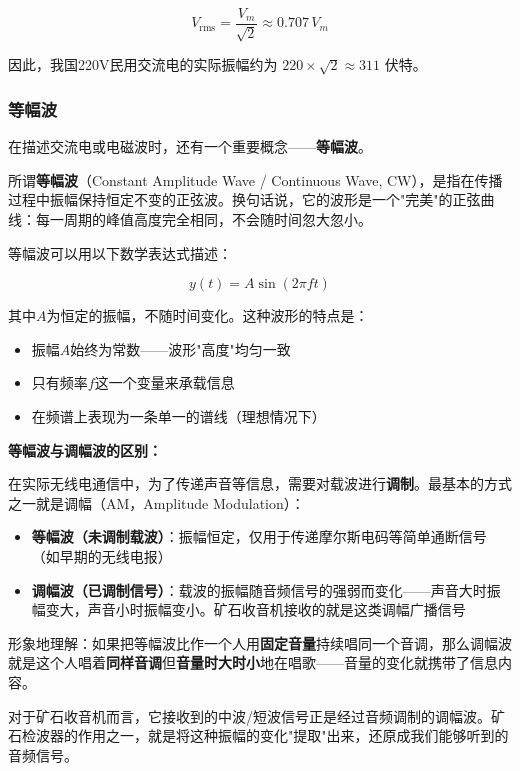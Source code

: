 \documentclass[12pt,UTF8]{ctexbook}
\begin{document}
\begin{equation}
	V_{\text{rms}} = \frac{V_{m}}{\sqrt{2}} \approx 0.707 \, V_{m}
\end{equation}

因此，我国220V民用交流电的实际振幅约为 $220 \times \sqrt{2} \approx 311$ 伏特。\subsubsection{等幅波}

在描述交流电或电磁波时，还有一个重要概念——\textbf{等幅波}。

所谓\textbf{等幅波}（Constant Amplitude Wave / Continuous Wave, CW），是指在传播过程中振幅保持恒定不变的正弦波。换句话说，它的波形是一个"完美"的正弦曲线：每一周期的峰值高度完全相同，不会随时间忽大忽小。

等幅波可以用以下数学表达式描述：

\begin{equation}
	y(t) = A \sin(2\pi f t)
\end{equation}

其中$A$为恒定的振幅，不随时间变化。这种波形的特点是：
\begin{itemize}
	\item 振幅$A$始终为常数——波形"高度"均匀一致
	\item 只有频率$f$这一个变量来承载信息
	\item 在频谱上表现为一条单一的谱线（理想情况下）
\end{itemize}

\textbf{等幅波与调幅波的区别：}

在实际无线电通信中，为了传递声音等信息，需要对载波进行\textbf{调制}。最基本的方式之一就是调幅（AM，Amplitude Modulation）：

\begin{itemize}
	\item \textbf{等幅波（未调制载波）}：振幅恒定，仅用于传递摩尔斯电码等简单通断信号（如早期的无线电报）
	
	\item \textbf{调幅波（已调制信号）}：载波的振幅随音频信号的强弱而变化——声音大时振幅变大，声音小时振幅变小。矿石收音机接收的就是这类调幅广播信号
\end{itemize}

形象地理解：如果把等幅波比作一个人用\textbf{固定音量}持续唱同一个音调，那么调幅波就是这个人唱着\textbf{同样音调}但\textbf{音量时大时小}地在唱歌——音量的变化就携带了信息内容。

对于矿石收音机而言，它接收到的中波/短波信号正是经过音频调制的调幅波。矿石检波器的作用之一，就是将这种振幅的变化"提取"出来，还原成我们能够听到的音频信号。
\end{document}
